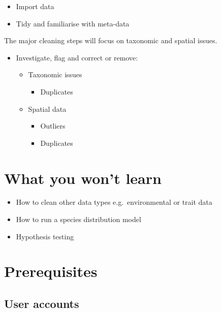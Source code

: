 \documentclass[
  letterpaper,
  DIV=11,
  numbers=noendperiod,
  oneside]{scrreprt}
\providecommand{\tightlist}{%
  \setlength{\itemsep}{0pt}\setlength{\parskip}{0pt}}\usepackage{longtable,booktabs,array}
\begin{document}
\begin{itemize}
\tightlist
\item
  Import data
\item
  Tidy and familiarise with meta-data
\end{itemize}

The major cleaning steps will focus on taxonomic and spatial issues.

\begin{itemize}
\tightlist
\item
  Investigate, flag and correct or remove:

  \begin{itemize}
  \tightlist
  \item
    Taxonomic issues

    \begin{itemize}
    \tightlist
    \item
      Duplicates
    \end{itemize}
  \item
    Spatial data

    \begin{itemize}
    \tightlist
    \item
      Outliers
    \item
      Duplicates
    \end{itemize}
  \end{itemize}
\end{itemize}

\hypertarget{what-you-wont-learn}{%
\section{What you won't learn}\label{what-you-wont-learn}}

\begin{itemize}
\tightlist
\item
  How to clean other data types e.g.~environmental or trait data
\item
  How to run a species distribution model
\item
  Hypothesis testing
\end{itemize}

\hypertarget{prerequisites}{%
\section{Prerequisites}\label{prerequisites}}

\hypertarget{user-accounts}{%
\subsection{User accounts}\label{user-accounts}}
\end{document}
